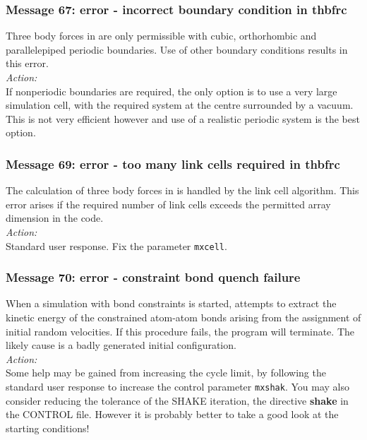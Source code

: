 \subsubsection*{Message 67: error - incorrect boundary condition in
thbfrc}

Three body forces in \D{} are only permissible with cubic, orthorhombic and
parallelepiped  periodic
boundaries. Use of other boundary conditions  results in this error. \\

\noindent
{\em Action:} \\
If nonperiodic boundaries are required, the only option is to use a
very large simulation cell, with the required system at the centre
surrounded by a vacuum. This is not very efficient however and use of
a realistic periodic system is the best option.

\subsubsection*{Message 69: error - too many link cells required in
thbfrc}

The calculation of three body forces  in \D{} is handled by
the link cell algorithm. This error arises if the required number of
link cells exceeds the permitted array dimension in the code. \\

\noindent
{\em Action:} \\
Standard user response. Fix the parameter {\tt mxcell}.

\subsubsection*{Message 70: error - constraint bond quench failure}

When a simulation with bond constraints  is started, \D{} attempts
to extract the kinetic energy of the constrained atom-atom bonds
arising from the assignment of initial random velocities. If this
procedure fails, the program will terminate. The likely cause is a
badly generated initial configuration.\\

\noindent
{\em Action:} \\ Some help may be gained from increasing the cycle
limit, by following the standard user response to increase the control
parameter {\tt mxshak}.  You may also consider reducing the tolerance
of the SHAKE iteration, the directive {\bf shake} in the CONTROL
file. However it is probably better to take a good look at the
starting conditions!

